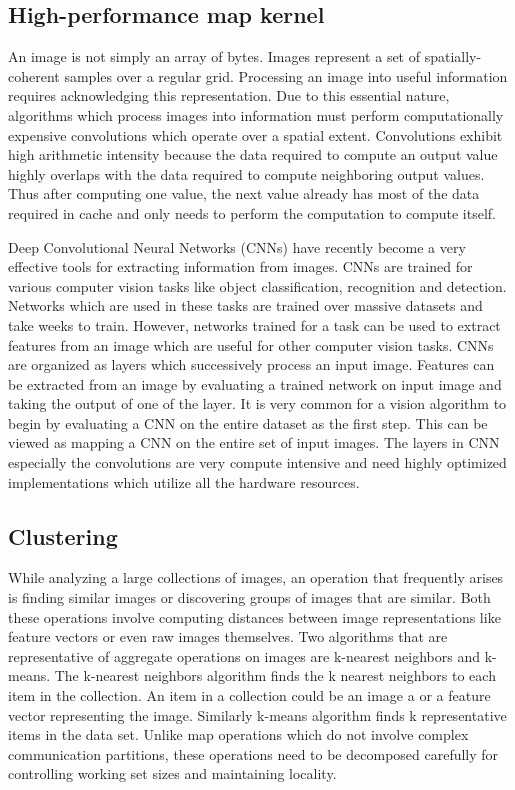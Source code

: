 \documentclass[tog]{acmsiggraph}
\begin{document}
\subsection{High-performance map kernel}
An image is not simply an array of bytes. Images represent a set of
spatially-coherent samples over a regular grid. Processing an image into useful
information requires acknowledging this representation. Due to this essential
nature, algorithms which process images into information must perform
computationally expensive convolutions which operate over a spatial
extent. Convolutions exhibit high arithmetic intensity because the data
required to compute an output value highly overlaps with the data required to
compute neighboring output values. Thus after computing one value, the next
value already has most of the data required in cache and only needs to
perform the computation to compute itself.

Deep Convolutional Neural Networks (CNNs) have recently become a very effective
tools for extracting information from images. CNNs are trained for various
computer vision tasks like object classification, recognition and detection.
Networks which are used in these tasks are trained over massive datasets and
take weeks to train. However, networks trained for a task can be used to extract
features from an image which are useful for other computer vision tasks. CNNs
are organized as layers which successively process an input image. Features can
be extracted from an image by evaluating a trained network on input image and
taking the output of one of the layer. It is very common for a vision algorithm
to begin by evaluating a CNN on the entire dataset as the first step. This can
be viewed as mapping a CNN on the entire set of input images. The layers in CNN
especially the convolutions are very compute intensive and need highly optimized
implementations which utilize all the hardware resources.

\subsection{Clustering}

While analyzing a large collections of images, an operation that frequently
arises is finding similar images or discovering groups of images that are
similar. Both these operations involve computing distances between image
representations like feature vectors or even raw images themselves. Two
algorithms that are representative of aggregate operations on images are
k-nearest neighbors and k-means. The k-nearest neighbors algorithm finds the k
nearest neighbors to each item in the collection. An item in a collection could
be an image a or a feature vector representing the image. Similarly k-means
algorithm finds k representative items in the data set. Unlike map operations
which do not involve complex communication partitions, these operations need to
be decomposed carefully for controlling working set sizes and maintaining
locality.
\end{document}
